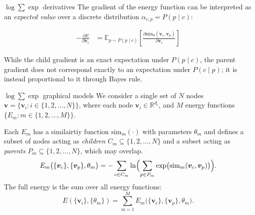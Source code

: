 \documentclass{beamer}
\begin{document}
\begin{frame}{$\log \sum \exp$ derivatives}
    The gradient of the energy function can be interpreted as an \emph{expected value} over a discrete distribution $\alpha_{c,p} = P(p \mid c)$:

    \begin{equation}
    \begin{aligned}
        -\frac{\partial E}{\partial \bm{v}_c} &= \mathbb{E}_{p \sim P(p \mid c)} \left[ \frac{\partial \mathrm{sim}_\theta(\bm{v}_c, \bm{v}_p)}{\partial \bm{v}_c} \right]
    \end{aligned}
    \end{equation}

    \bigskip

    While the child gradient is an exact expectation under $P(p \mid c)$, the parent gradient does not correspond exactly to an expectation under $P(c \mid p)$; it is instead proportional to it through Bayes rule. 
\end{frame}


\begin{frame}{$\log \sum \exp$ graphical models}
    We consider a single set of \(N\) nodes \(\bm{v} = \{\bm{v}_i : i \in \{1, 2, \ldots, N\}\}\), where each node \(\bm{v}_i \in \mathbb{R}^{d_i}\), and \(M\) energy functions \(\{E_m : m \in \{1, 2, \ldots, M\}\}\).

    \bigskip
    
    Each \(E_m\) has a similairtiy function $\mathrm{sim}_{m}(\cdot)$ with parameters \(\theta_m\) and defines a subset of nodes acting as \emph{children} \(C_m \subseteq \{1, 2, \ldots, N\}\) and a subset acting as \emph{parents} \(P_m \subseteq \{1, 2, \ldots, N\}\), which may overlap.
    \[
    E_m\bigl(\{\bm{v}_c\}, \{\bm{v}_p\}, \theta_m\bigr) = -\sum_{c \in C_m} \ln \Bigl(\sum_{p \in P_m} \exp\bigl(\mathrm{sim}_{m}(\bm{v}_c, \bm{v}_p)\bigr)\Bigr).
    \]
    The full energy is the sum over all energy functions:
    \[
    E(\{\bm{v}_i\}, \{\theta_m\}) = \sum_{m=1}^{M} E_m\bigl(\{\bm{v}_c\}, \{\bm{v}_p\}, \theta_m\bigr).
    \]

\end{frame}
\end{document}
